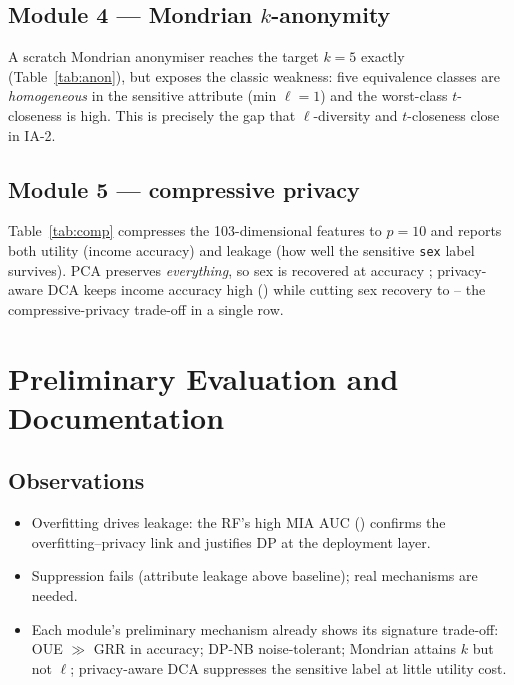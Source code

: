 \documentclass[11pt,a4paper]{article}
\begin{document}
\subsection{Module 4 --- Mondrian $k$-anonymity}
A scratch Mondrian anonymiser reaches the target $k=5$ exactly
(Table~\ref{tab:anon}), but exposes the classic weakness: five equivalence classes
are \emph{homogeneous} in the sensitive attribute (min $\ell=1$) and the worst-class
$t$-closeness is high. This is precisely the gap that $\ell$-diversity and
$t$-closeness close in IA-2.
\begin{table}[htbp]\centering\caption{Preliminary Mondrian $k$-anonymity ($k=5$) and its homogeneity weakness.}\label{tab:anon}

\end{table}

\subsection{Module 5 --- compressive privacy}
Table~\ref{tab:comp} compresses the 103-dimensional features to $p=10$ and reports
both utility (income accuracy) and leakage (how well the sensitive \texttt{sex}
label survives). PCA preserves \emph{everything}, so sex is recovered at accuracy
\PCAsex{}; privacy-aware DCA keeps income accuracy high (\PADCAincome{}) while
cutting sex recovery to \PADCAsex{} -- the compressive-privacy trade-off in a single
row.
\begin{table}[htbp]\centering\caption{Preliminary PCA vs DCA ($p=10$): utility is income accuracy, leakage is sex accuracy.}\label{tab:comp}

\end{table}

\section{Preliminary Evaluation and Documentation}\label{sec:eval}

\subsection{Observations}
\begin{itemize}
\item Overfitting drives leakage: the RF's high MIA AUC (\RFMIA{}) confirms the
overfitting--privacy link and justifies DP at the deployment layer.
\item Suppression fails (attribute leakage \AIleak{} above baseline); real
mechanisms are needed.
\item Each module's preliminary mechanism already shows its signature trade-off:
OUE $\gg$ GRR in accuracy; DP-NB noise-tolerant; Mondrian attains $k$ but not
$\ell$; privacy-aware DCA suppresses the sensitive label at little utility cost.
\end{itemize}
\end{document}
